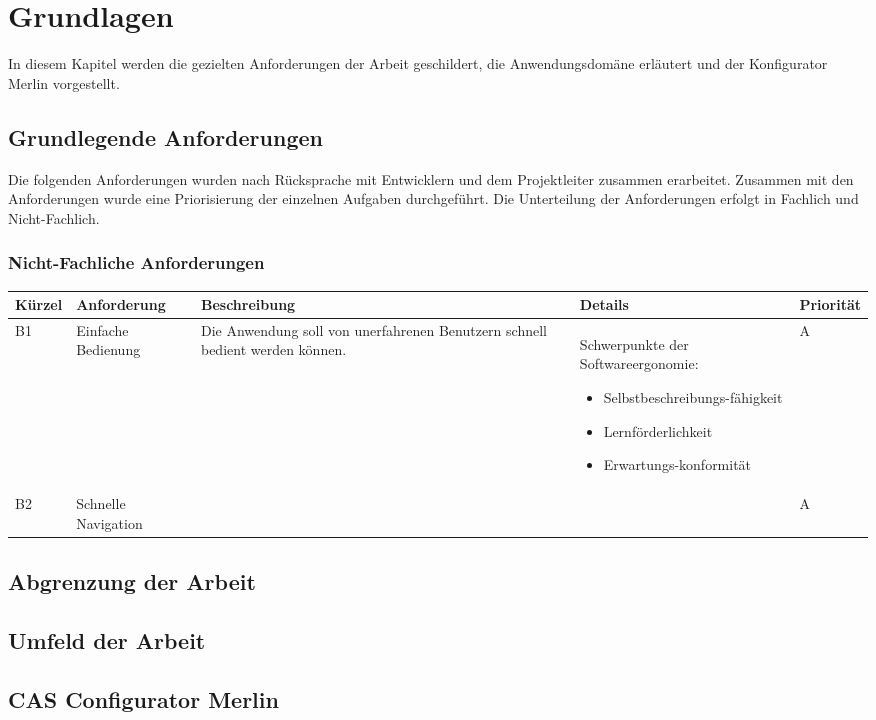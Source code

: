 

\chapter{Grundlagen} \label{chapter_2}

In diesem Kapitel werden die gezielten Anforderungen der Arbeit geschildert, die Anwendungsdomäne erläutert und der Konfigurator Merlin vorgestellt. 

\section{Grundlegende Anforderungen}
Die folgenden Anforderungen wurden nach Rücksprache mit Entwicklern und dem Projektleiter zusammen erarbeitet. Zusammen mit den Anforderungen wurde eine Priorisierung der einzelnen Aufgaben durchgeführt. Die Unterteilung der Anforderungen erfolgt in Fachlich und Nicht-Fachlich.

\subsection{Nicht-Fachliche Anforderungen}
\begin{tabular}{| p{1.1cm} | p{2.2cm} | p{4.3cm} | p{4.9cm} | p{1.3cm} |}
\toprule[2pt] \rowcolor{dunkelgrau}
\hline
  Kürzel & Anforderung & Beschreibung & Details & Priorität \\
  \hline
  B1 & Einfache \newline Bedienung & Die Anwendung soll von unerfahrenen Benutzern schnell bedient werden können.& Schwerpunkte der Softwareergonomie\newline\cite{bib:softwareErgonomie}: 
  \begin{itemize}
        \item Selbstbeschreibungs-fähigkeit
        \item Lernförderlichkeit
        \item Erwartungs-konformität
     \end{itemize}
   & A \\
  \hline
  B2 & Schnelle Navigation & &  & A \\
    \hline
\bottomrule[2pt]
 \end{tabular}

\section{Abgrenzung der Arbeit}

\section{Umfeld der Arbeit}

\section{CAS Configurator Merlin}
